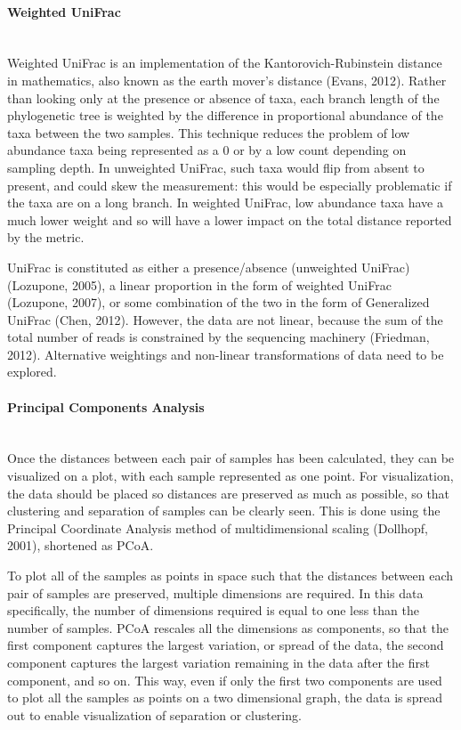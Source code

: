 \FloatBarrier

\paragraph{Weighted UniFrac}\mbox{}\\
Weighted UniFrac is an implementation of the Kantorovich-Rubinstein distance in mathematics, also known as the earth mover's distance (Evans, 2012). Rather than looking only at the presence or absence of taxa, each branch length of the phylogenetic tree is weighted by the difference in proportional abundance of the taxa between the two samples. This technique reduces the problem of low abundance taxa being represented as a 0 or by a low count depending on sampling depth. In unweighted UniFrac, such taxa would flip from absent to present, and could skew the measurement: this would be especially problematic if the taxa are on a long branch. In weighted UniFrac, low abundance taxa have a much lower weight and so will have a lower impact on the total distance reported by the metric.

UniFrac is constituted as either a presence/absence (unweighted UniFrac) (Lozupone, 2005), a linear proportion in the form of weighted UniFrac (Lozupone, 2007), or some combination of the two in the form of Generalized UniFrac (Chen, 2012). However, the data are not linear, because the sum of the total number of reads is constrained by the sequencing machinery (Friedman, 2012). Alternative weightings and non-linear transformations of data need to be explored.

\paragraph{Principal Components Analysis}\mbox{}\\
Once the distances between each pair of samples has been calculated, they can be visualized on a plot, with each sample represented as one point. For visualization, the data should be placed so distances are preserved as much as possible, so that clustering and separation of samples can be clearly seen. This is done using the Principal Coordinate Analysis method of multidimensional scaling (Dollhopf, 2001), shortened as PCoA.

To plot all of the samples as points in space such that the distances between each pair of samples are preserved, multiple dimensions are required. In this data specifically, the number of dimensions required is equal to one less than the number of samples. PCoA rescales all the dimensions as components, so that the first component captures the largest variation, or spread of the data, the second component captures the largest variation remaining in the data after the first component, and so on. This way, even if only the first two components are used to plot all the samples as points on a two dimensional graph, the data is spread out to enable visualization of separation or clustering.

